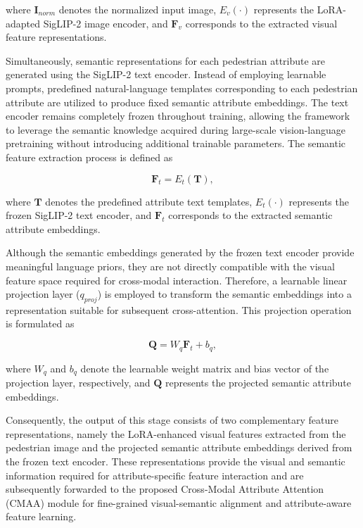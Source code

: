 \documentclass{ieeeaccess}
\begin{document}
where $\mathbf{I}_{norm}$ denotes the normalized input image, $E_{v}(\cdot)$ represents the LoRA-adapted SigLIP-2 image encoder, and $\mathbf{F}_{v}$ corresponds to the extracted visual feature representations.

Simultaneously, semantic representations for each pedestrian attribute are generated using the SigLIP-2 text encoder. Instead of employing learnable prompts, predefined natural-language templates corresponding to each pedestrian attribute are utilized to produce fixed semantic attribute embeddings. The text encoder remains completely frozen throughout training, allowing the framework to leverage the semantic knowledge acquired during large-scale vision-language pretraining without introducing additional trainable parameters. The semantic feature extraction process is defined as

\begin{equation}
\mathbf{F}_{t}=E_{t}(\mathbf{T}),
\label{eq:text_features}
\end{equation}

where $\mathbf{T}$ denotes the predefined attribute text templates, $E_{t}(\cdot)$ represents the frozen SigLIP-2 text encoder, and $\mathbf{F}_{t}$ corresponds to the extracted semantic attribute embeddings.

Although the semantic embeddings generated by the frozen text encoder provide meaningful language priors, they are not directly compatible with the visual feature space required for cross-modal interaction. Therefore, a learnable linear projection layer ($q_{proj}$) is employed to transform the semantic embeddings into a representation suitable for subsequent cross-attention. This projection operation is formulated as

\begin{equation}
\mathbf{Q}=W_{q}\mathbf{F}_{t}+b_{q},
\label{eq:qproj}
\end{equation}

where $W_{q}$ and $b_{q}$ denote the learnable weight matrix and bias vector of the projection layer, respectively, and $\mathbf{Q}$ represents the projected semantic attribute embeddings.

Consequently, the output of this stage consists of two complementary feature representations, namely the LoRA-enhanced visual features extracted from the pedestrian image and the projected semantic attribute embeddings derived from the frozen text encoder. These representations provide the visual and semantic information required for attribute-specific feature interaction and are subsequently forwarded to the proposed Cross-Modal Attribute Attention (CMAA) module for fine-grained visual-semantic alignment and attribute-aware feature learning.
\end{document}
